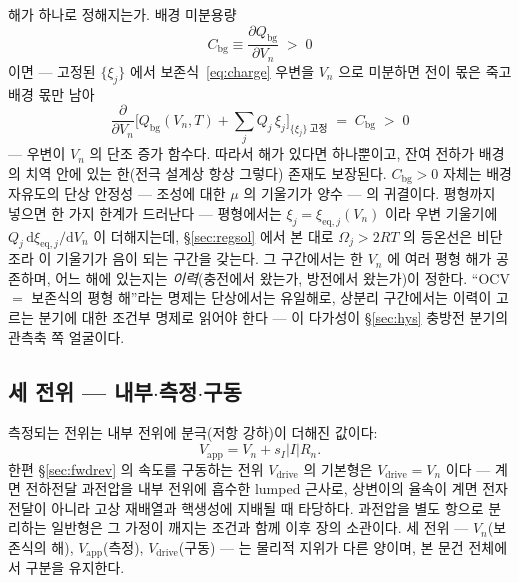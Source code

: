 \documentclass[11pt,a4paper]{article}
\newcommand{\dd}{\mathrm{d}}
\newcommand{\eq}{\mathrm{eq}}
\newcommand{\app}{\mathrm{app}}
\newcommand{\drive}{\mathrm{drive}}
\newcommand{\bg}{\mathrm{bg}}
\begin{document}
해가 하나로 정해지는가. 배경 미분용량
\begin{equation}
C_\bg\equiv\frac{\partial Q_\bg}{\partial V_n}\;>\;0
\label{eq:cbg}
\end{equation}
이면 — 고정된 $\{\xi_j\}$ 에서 보존식~\eqref{eq:charge} 우변을 $V_n$ 으로 미분하면 전이 몫은
죽고 배경 몫만 남아
\begin{equation}
\frac{\partial}{\partial V_n}\Big[Q_\bg(V_n,T)+\sum_jQ_j\,\xi_j\Big]_{\{\xi_j\}\ \text{고정}}
\;=\;C_\bg\;>\;0
\label{eq:unique}
\end{equation}
— 우변이 $V_n$ 의 단조 증가 함수다. 따라서 해가 있다면 하나뿐이고, 잔여
전하가 배경의 치역 안에 있는 한(전극 설계상 항상 그렇다) 존재도 보장된다.
$C_\bg>0$ 자체는 배경 자유도의 단상 안정성 — 조성에 대한 $\mu$ 의 기울기가 양수 — 의 귀결이다. 평형까지 넣으면
한 가지 한계가 드러난다 — 평형에서는 $\xi_j=\xi_{\eq,j}(V_n)$ 이라 우변 기울기에
$Q_j\,\dd\xi_{\eq,j}/\dd V_n$ 이 더해지는데, \S\ref{sec:regsol} 에서 본 대로 $\Omega_j>2RT$ 의
등온선은 비단조라 이 기울기가 음이 되는 구간을 갖는다. 그 구간에서는 한 $V_n$ 에 여러 평형 해가 공존하며,
어느 해에 있는지는 \emph{이력}(충전에서 왔는가, 방전에서 왔는가)이 정한다. ``OCV $=$ 보존식의 평형 해''라는
명제는 단상에서는 유일해로, 상분리 구간에서는 이력이 고르는 분기에 대한 조건부 명제로 읽어야 한다 — 이
다가성이 \S\ref{sec:hys} 충방전 분기의 관측축 쪽 얼굴이다.

\subsection{세 전위 — 내부$\cdot$측정$\cdot$구동}
측정되는 전위는 내부 전위에 분극(저항 강하)이 더해진 값이다:
\begin{equation}
V_\app=V_n+s_I|I|R_n.
\label{eq:vapp}
\end{equation}
한편 \S\ref{sec:fwdrev} 의 속도를 구동하는 전위 $V_\drive$ 의 기본형은 $V_\drive=V_n$ 이다 — 계면
전하전달 과전압을 내부 전위에 흡수한 lumped 근사로, 상변이의 율속이 계면 전자전달이 아니라 고상 재배열과
핵생성에 지배될 때 타당하다. 과전압을 별도 항으로 분리하는 일반형은 그 가정이 깨지는 조건과 함께 이후 장의
소관이다. 세 전위 — $V_n$(보존식의 해), $V_\app$(측정), $V_\drive$(구동) — 는 물리적 지위가 다른 양이며,
본 문건 전체에서 구분을 유지한다.
\end{document}
